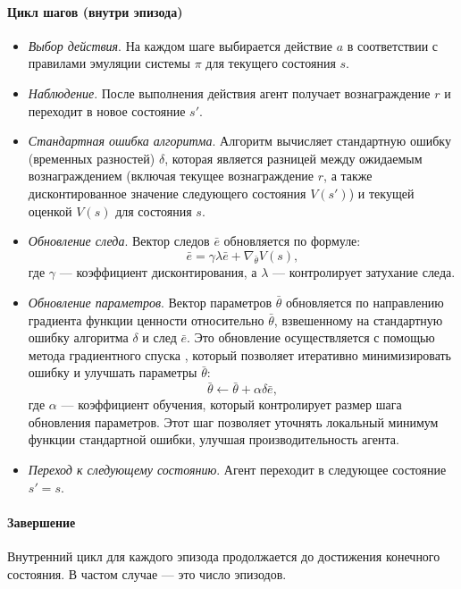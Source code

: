 \paragraph{Цикл шагов (внутри эпизода)}
\begin{itemize}
    \item \textit{Выбор действия}. На каждом шаге выбирается действие $a$ в соответствии с правилами эмуляции системы $\pi$ для текущего состояния $s$.
    \item \textit{Наблюдение}. После выполнения действия агент получает вознаграждение $r$ и переходит в новое состояние $s'$.
    \item \textit{Стандартная ошибка алгоритма}. Алгоритм вычисляет стандартную ошибку (временных разностей) $\delta$, которая является разницей между ожидаемым вознаграждением (включая текущее вознаграждение $r$, а также дисконтированное значение следующего состояния $V(s')$) и текущей оценкой $V(s)$ для состояния $s$.
    \item \textit{Обновление следа}. Вектор следов $\bar{e}$ обновляется по формуле:
    \begin{equation}
        \bar{e} = \gamma \lambda \bar{e} + \nabla_{\bar{\theta}} V(s),
    \end{equation}
    где $\gamma$ --- коэффициент дисконтирования, а $\lambda$ --- контролирует затухание следа.
    \item \textit{Обновление параметров}. Вектор параметров $\bar{\theta}$ обновляется по направлению градиента функции ценности относительно $\bar{\theta}$, взвешенному на стандартную ошибку алгоритма $\delta$ и след $\bar{e}$. Это обновление осуществляется с помощью метода градиентного спуска \cite{gradient-descent}, который позволяет итеративно минимизировать ошибку и улучшать параметры $\bar{\theta}$:
    \begin{equation}
        \bar{\theta} \gets \bar{\theta} + \alpha \delta \bar{e},
    \end{equation}
    где $\alpha$ --- коэффициент обучения, который контролирует размер шага обновления параметров. Этот шаг позволяет уточнять локальный минимум функции стандартной ошибки, улучшая производительность агента.
    \item \textit{Переход к следующему состоянию}. Агент переходит в следующее состояние $s' = s$.
    \end{itemize}

\paragraph{Завершение}
Внутренний цикл для каждого эпизода продолжается до достижения конечного состояния. В частом случае --- это число эпизодов.

